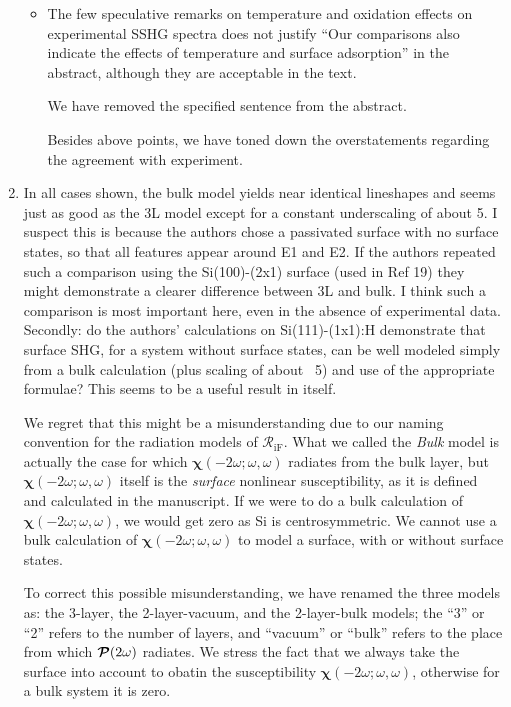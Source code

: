 \documentclass[11pt]{article}
\begin{document}
\begin{enumerate}
\begin{itemize}
\item
The few speculative remarks on temperature and oxidation effects on experimental
SSHG spectra does not justify ``Our comparisons also indicate the effects of
temperature and surface adsorption'' in the abstract, although they are
acceptable in the text.
\begin{shaded}\label{ref1.06}
We have removed the specified sentence from the abstract.
\end{shaded}

\begin{shaded}\label{ref1.13}
Besides above points, we have toned down the overstatements regarding the
agreement with experiment.
\end{shaded}

\end{itemize}

\item
In all cases shown, the bulk model yields near identical lineshapes and seems
just as good as the 3L model except for a constant underscaling of about 5. I
suspect this is because the authors chose a passivated surface with no surface
states, so that all features appear around E1 and E2. If the authors repeated
such a comparison using the Si(100)-(2x1) surface (used in Ref 19) they might
demonstrate a clearer difference between 3L and bulk. I think such a comparison
is most important here, even in the absence of experimental data. Secondly: do
the authors' calculations on Si(111)-(1x1):H demonstrate that surface SHG, for a
system without surface states, can be well modeled simply from a bulk
calculation (plus scaling of about ~5) and use of the appropriate formulae? This
seems to be a useful result in itself.
\begin{shaded}\label{ref1.07}
We regret that this might be a misunderstanding due to our naming convention for
the radiation models of $\mathcal{R}_{\mathrm{iF}}$. What we called the {\em
Bulk} model is actually the case for which
$\boldsymbol{\chi}(-2\omega;\omega,\omega)$ radiates from the bulk layer, but
$\boldsymbol{\chi}(-2\omega;\omega,\omega)$ itself is the {\em surface}
nonlinear susceptibility, as it is defined and calculated in the manuscript. If
we were to do a bulk calculation of $\boldsymbol{\chi}(-2\omega;\omega,\omega)$,
we would get zero as  Si is centrosymmetric. We cannot use a bulk calculation of
$\boldsymbol{\chi}(-2\omega;\omega,\omega)$ to model a surface, with or without
surface states.

To correct this possible misunderstanding, we have renamed the three models as:
the 3-layer, the 2-layer-vacuum, and the 2-layer-bulk models; the ``3'' or ``2''
refers to the number of layers, and ``vacuum'' or ``bulk'' refers to the place
from which ${\boldsymbol{\cal P}}(2\omega)$ radiates. We stress the fact that we
always take the surface into account to obatin the susceptibility
$\boldsymbol{\chi}(-2\omega;\omega,\omega)$, otherwise for a bulk system it is
zero.


\end{shaded}
\end{enumerate}
\end{document}
